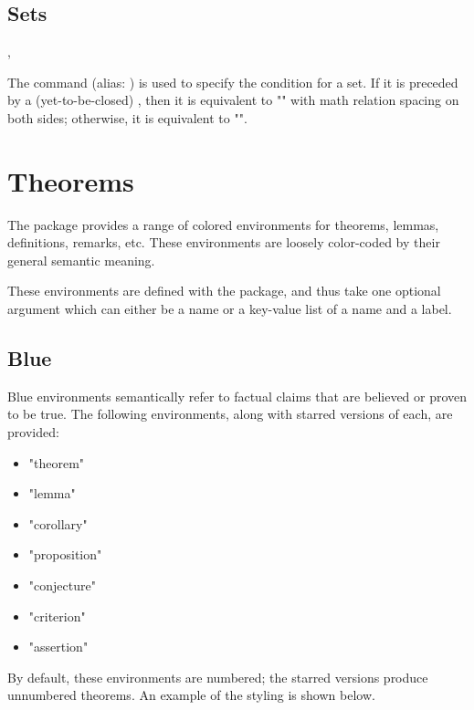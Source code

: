 \documentclass{l3doc}
\begin{document}
\subsection{Sets}

\begin{function}{\given, \suchthat}
  \begin{syntax}
  \end{syntax}

  The  command (alias: ) is used to specify the condition for a set. If it is preceded by a (yet-to-be-closed) , then it is equivalent to "\middle\vert" with math relation spacing on both sides; otherwise, it is equivalent to "\mid".
\end{function}

\section{Theorems}

The  package provides a range of colored environments for theorems, lemmas, definitions, remarks, etc. These environments are loosely color-coded by their general semantic meaning.

These environments are defined with the  package, and thus take one optional argument which can either be a name or a key-value list of a name and a label.

\subsection{Blue}

Blue environments semantically refer to factual claims that are believed or proven to be true. The following environments, along with starred versions of each, are provided: \begin{itemize}
  \item "theorem"
  \item "lemma"
  \item "corollary"
  \item "proposition"
  \item "conjecture"
  \item "criterion"
  \item "assertion"
\end{itemize}

By default, these environments are numbered; the starred versions produce unnumbered theorems. An example of the styling is shown below.
\end{document}
